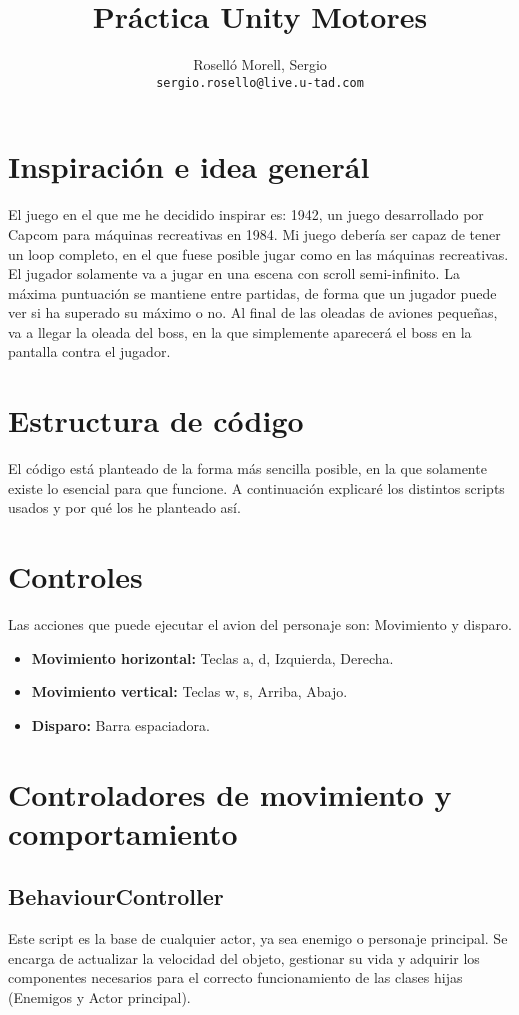 \documentclass[titlepage, 4apaper]{article}
\title{Práctica Unity Motores}
\author{Roselló Morell, Sergio\\
\texttt{sergio.rosello@live.u-tad.com}}
\begin{document}
\maketitle
\tableofcontents
\clearpage

\section{Inspiración e idea generál}
El juego en el que me he decidido inspirar es: 1942, un juego desarrollado por Capcom para máquinas recreativas en 1984. Mi juego debería ser capaz de tener un loop completo, en el que fuese posible jugar como en las máquinas recreativas. El jugador solamente va a jugar en una escena con scroll semi-infinito. La máxima puntuación se mantiene entre partidas, de forma que un jugador puede ver si ha superado su máximo o no. Al final de las oleadas de aviones pequeñas, va a llegar la oleada del boss, en la que simplemente aparecerá el boss en la pantalla contra el jugador.
\section{Estructura de código}
El código está planteado de la forma más sencilla posible, en la que solamente existe lo esencial para que funcione. A continuación explicaré los distintos scripts usados y por qué los he planteado así.
\section{Controles}
Las acciones que puede ejecutar el avion del personaje son: Movimiento y disparo.
\begin{itemize}
	\item \textbf{Movimiento horizontal:} Teclas a, d, Izquierda, Derecha.
	\item \textbf{Movimiento vertical:} Teclas w, s, Arriba, Abajo.
	\item \textbf{Disparo:} Barra espaciadora.
\end{itemize}
\section{Controladores de movimiento y comportamiento}
\subsection{BehaviourController}
Este script es la base de cualquier actor, ya sea enemigo o personaje principal. Se encarga de actualizar la velocidad del objeto, gestionar su vida y adquirir los componentes necesarios para el correcto funcionamiento de las clases hijas (Enemigos y Actor principal).
\end{document}
